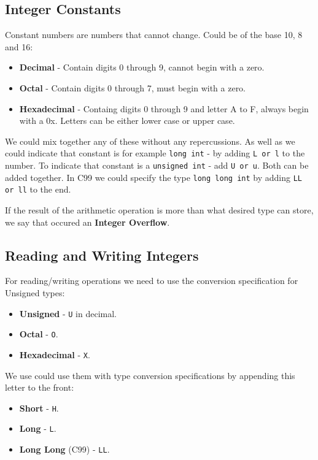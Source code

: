 \documentclass[openany]{book}
\begin{document}
    \subsection*{Integer Constants}
    Constant numbers are numbers that cannot change. Could be of the base 10, 8 and 16:
    \begin{itemize}
        \item \textbf{Decimal} - Contain digits 0 through 9, cannot begin with a zero.
        \item \textbf{Octal} - Contain digits 0 through 7, must begin with a zero.
        \item \textbf{Hexadecimal} - Containg digits 0 through 9 and letter A to F, always begin with a 0x. Letters can be either lower case or upper case.
    \end{itemize}

    We could mix together any of these without any repercussions. As well as we could indicate that constant is for example \texttt{long int} - by adding \texttt{L or l} to the number. To indicate that constant is a \texttt{unsigned int} - add \texttt{U or u}. Both can be added together. In C99 we could specify the type \texttt{long long int} by adding \texttt{LL or ll} to the end.

    \bigskip
    If the result of the arithmetic operation is more than what desired type can store, we say that occured an \textbf{Integer Overflow}.

    \subsection*{Reading and Writing Integers}
    For reading/writing operations we need to use the conversion specification for Unsigned types:
    \begin{itemize}
        \item \textbf{Unsigned} - \texttt{U} in decimal.
        \item \textbf{Octal} - \texttt{O}.
        \item \textbf{Hexadecimal} - \texttt{X}.
    \end{itemize} 
    We use could use them with type conversion specifications by appending this letter to the front:
    \begin{itemize}
        \item \textbf{Short} - \texttt{H}.
        \item \textbf{Long} - \texttt{L}.
        \item \textbf{Long Long} (C99) - \texttt{LL}.
    \end{itemize}
\end{document}
